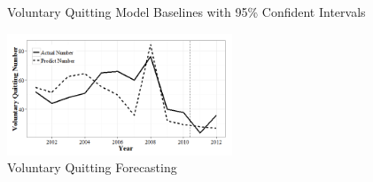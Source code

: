 \documentclass[12pt,letterpaper]{article}
\begin{document}
\begin{table}[htbp]
\begin{threeparttable}
	\end{threeparttable}
	\label{tab:vqparaest}%
\end{table}

\begin{figure}[h!]
	\centering
	\caption{Voluntary Quitting Model Baselines with 95\% Confident Intervals}
	\label{fig:vqbasepred}
\end{figure}


\begin{figure}[h!]
	\centering
	\includegraphics[width=0.6\textwidth]{vq.png}
	\caption{Voluntary Quitting Forecasting}
	\label{fig:predictvq}	
	
\end{figure}
\end{document}
